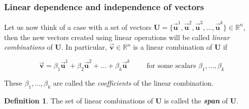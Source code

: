 \documentclass[a4paper,11pt]{article}
\theoremstyle{definition}
\newtheorem{definition}{Definition}
\theoremstyle{plain}
\begin{document}
\subsubsection{Linear dependence and independence of
vectors}\label{linear-dependence-and-independence-of-vectors}

Let us now think of a case with a set of vectors
\(\mathbf{U} = \{\vec{\mathbf{u}}^1,\vec{\mathbf{u}}^2,\vec{\mathbf{u}}^3,\ldots,\vec{\mathbf{u}}^k\}\in\mathbb{R}^n\),
then the new vectors created using linear operations will be called
\emph{linear combinations} of \(\mathbf{U}\). In particular,
\(\vec{\mathbf{v}}\in\mathbb{R}^n\) is a linear combination of
\(\mathbf{U}\) if

\[
\vec{\mathbf{v}} = \beta_1\vec{\mathbf{u}}^1 + \beta_2\vec{\mathbf{u}}^2 + \ldots + \beta_k\vec{\mathbf{u}}^k \qquad \text{ for some scalars } \beta_1,\ldots, \beta_k
\]

These \(\beta_1,\ldots,\beta_k\) are called the \emph{coefficients} of
the linear combination.

\begin{definition}
The set of linear combinations of \(\mathbf{U}\) is
called the \textbf{\emph{span}} of \(\mathbf{U}\).
\end{definition}
\end{document}
